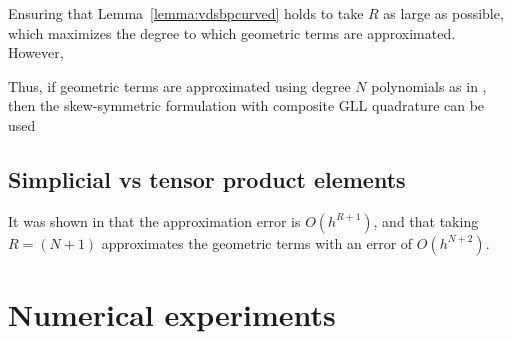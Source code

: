 \documentclass[preprint,10pt]{elsarticle}
\theoremstyle{definition}
\theoremstyle{lemma}
\theoremstyle{corollary}
\theoremstyle{theorem}
\newtheorem{theorem}{Theorem}
\theoremstyle{assumption}
\renewcommand{\hat}[1]{\widehat{#1}}
\newcommand{\LRp}[1]{\left( #1 \right)}
\newcommand{\note}[1]{{\color{blue}{#1}}}
\begin{document}
Ensuring that Lemma~\ref{lemma:vdsbpcurved} holds to take $R$ as large as possible, which maximizes the degree to which geometric terms are approximated.  However, 

%
%
Thus, if geometric terms are approximated using degree $N$ polynomials as in \cite{kopriva2006metric}, then the skew-symmetric formulation with composite GLL quadrature can be used 


\subsection{Simplicial vs tensor product elements}

It was shown in \cite{chan2018discretely} that the approximation error is $O\LRp{h^{R+1}}$, and that taking $R = (N+1)$ approximates the geometric terms with an error of $O(h^{N+2})$.

\note{Need to note image of curl is in different spaces for simplicial vs tensor product elements.  Influences proofs that geometric terms satisfy appropriate assumptions in those cases.}



\section{Numerical experiments}
\end{document}
